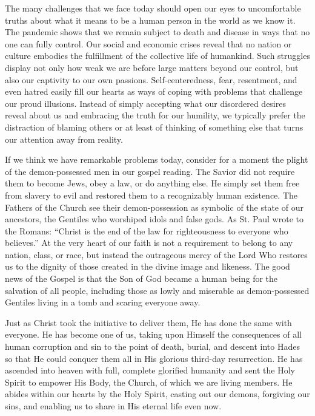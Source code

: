 \documentclass[twoside, letterpaper, 12pt]{report}
\begin{document}
\peopleline{\gne}


\begin{maybetwocolumns}

The many challenges that we face today should open our eyes to uncomfortable truths about what it
means to be a human person in the world as we know it.  The pandemic shows that we remain subject to
death and disease in ways that no one can fully control.  Our social and economic crises reveal that
no nation or culture embodies the fulfillment of the collective life of humankind.  Such struggles
display not only how weak we are before large matters beyond our control, but also our captivity to
our own passions.  Self-centeredness, fear, resentment, and even hatred easily fill our hearts as
ways of coping with problems that challenge our proud illusions.  Instead of simply accepting what
our disordered desires reveal about us and embracing the truth for our humility, we typically prefer
the distraction of blaming others or at least of thinking of something else that turns our attention
away from reality.

If we think we have remarkable problems today, consider for a moment the plight of the
demon-possessed men in our gospel reading.  The Savior did not require them to become Jews, obey a
law, or do anything else.  He simply set them free from slavery to evil and restored them to a
recognizably human existence. The Fathers of the Church see their demon-possession as symbolic of
the state of our ancestors, the Gentiles who worshiped idols and false gods.  As St. Paul wrote to
the Romans:  “Christ is the end of the law for righteousness to everyone who believes.”  At the very
heart of our faith is not a requirement to belong to any nation, class, or race, but instead the
outrageous mercy of the Lord Who restores us to the dignity of those created in the divine image and
likeness. The good news of the Gospel is that the Son of God became a human being for the salvation
of all people, including those as lowly and miserable as demon-possessed Gentiles living in a tomb
and scaring everyone away.

Just as Christ took the initiative to deliver them, He has done the same with everyone.  He has
become one of us, taking upon Himself the consequences of all human corruption and sin to the point
of death, burial, and descent into Hades so that He could conquer them all in His glorious third-day
resurrection.  He has ascended into heaven with full, complete glorified humanity and sent the Holy
Spirit to empower His Body, the Church, of which we are living members.  He abides within our hearts
by the Holy Spirit, casting out our demons, forgiving our sins, and enabling us to share in His
eternal life even now.


\end{maybetwocolumns}
\end{document}

